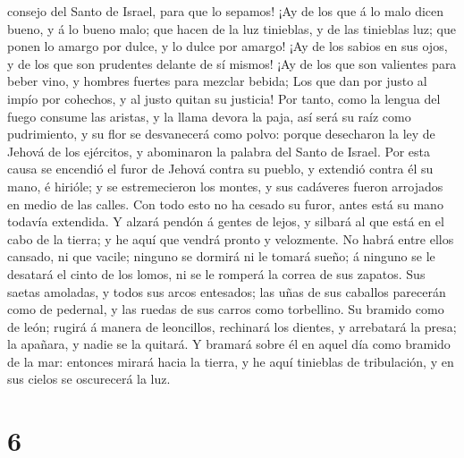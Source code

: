 consejo del Santo de Israel, para que lo sepamos!  ¡Ay de
los que á lo malo dicen bueno, y á lo bueno malo; que hacen de la luz
tinieblas, y de las tinieblas luz; que ponen lo amargo por dulce, y lo
dulce por amargo!  ¡Ay de los sabios en sus ojos, y de los
que son prudentes delante de sí mismos!  ¡Ay de los que son
valientes para beber vino, y hombres fuertes para mezclar bebida;
 Los que dan por justo al impío por cohechos, y al justo
quitan su justicia!  Por tanto, como la lengua del fuego
consume las aristas, y la llama devora la paja, así será su raíz como
pudrimiento, y su flor se desvanecerá como polvo: porque desecharon la
ley de Jehová de los ejércitos, y abominaron la palabra del Santo de
Israel.  Por esta causa se encendió el furor de Jehová
contra su pueblo, y extendió contra él su mano, é hirióle; y se
estremecieron los montes, y sus cadáveres fueron arrojados en medio de
las calles. Con todo esto no ha cesado su furor, antes está su mano
todavía extendida.  Y alzará pendón á gentes de lejos, y
silbará al que está en el cabo de la tierra; y he aquí que vendrá pronto
y velozmente.  No habrá entre ellos cansado, ni que vacile;
ninguno se dormirá ni le tomará sueño; á ninguno se le desatará el cinto
de los lomos, ni se le romperá la correa de sus zapatos. 
Sus saetas amoladas, y todos sus arcos entesados; las uñas de sus
caballos parecerán como de pedernal, y las ruedas de sus carros como
torbellino.  Su bramido como de león; rugirá á manera de
leoncillos, rechinará los dientes, y arrebatará la presa; la apañara, y
nadie se la quitará.  Y bramará sobre él en aquel día como
bramido de la mar: entonces mirará hacia la tierra, y he aquí tinieblas
de tribulación, y en sus cielos se oscurecerá la luz.

\hypertarget{section-5}{%
\section{6}\label{section-5}}


